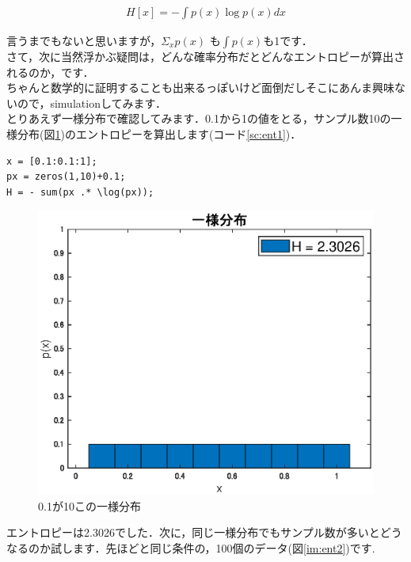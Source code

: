 \documentclass[11pt,a4paper]{ujreport}
\begin{document}
\begin{eqnarray}
\label{eq:entropy2}
H[x] = - \int p(x) \log p(x) dx
\end{eqnarray}

言うまでもないと思いますが，$ \Sigma_{x} p(x)$ も$ \int p(x)$も1です．\\

さて，次に当然浮かぶ疑問は，どんな確率分布だとどんなエントロピーが算出されるのか，です．\\

ちゃんと数学的に証明することも出来るっぽいけど面倒だしそこにあんま興味ないので，simulationしてみます．\\

とりあえず一様分布で確認してみます．0.1から1の値をとる，サンプル数10の一様分布(図\ref{im:ent1})のエントロピーを算出します(コード\ref{sc:ent1})．
\begin{lstlisting}[caption=エントロピーの計算,label=sc:ent1]
x = [0.1:0.1:1];
px = zeros(1,10)+0.1;
H = - sum(px .* \log(px));

\end{lstlisting}

\begin{figure}[H]
\label{im:ent1}
  \centering
  \includegraphics[width=15cm]{../figures/ent_uni.eps}
  \caption{0.1が10この一様分布}
\end{figure}

エントロピーは2.3026でした．次に，同じ一様分布でもサンプル数が多いとどうなるのか試します．先ほどと同じ条件の，100個のデータ(図\ref{im:ent2})です.
\end{document}
